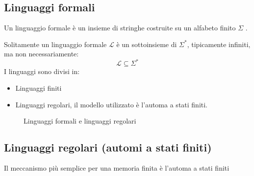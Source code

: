 \documentclass[a4paper]{article}
\begin{document}
\subsection{Linguaggi formali}
\begin{definition}
  Un linguaggio formale è un insieme di stringhe costruite su un alfabeto finito \( \Sigma  \) .
\end{definition}
Solitamente un linguaggio formale \( \mathcal{L} \) è un sottoinsieme di \( \Sigma^* \),
tipicamente infiniti, ma non necessariamente:
\[
  \mathcal{L} \subseteq \Sigma^*
\] 
I linguaggi sono divisi in:
\begin{itemize}
  \item Linguaggi finiti
  \item Linguaggi regolari, il modello utilizzato è l'automa a stati finiti.
\end{itemize}
\begin{figure}[H]
  \centering
  \caption{Linguaggi formali e linguaggi regolari}
\end{figure}

\subsection{Linguaggi regolari (automi a stati finiti)}
Il meccanismo più semplice per una memoria finita è l'automa a stati finiti
\end{document}
